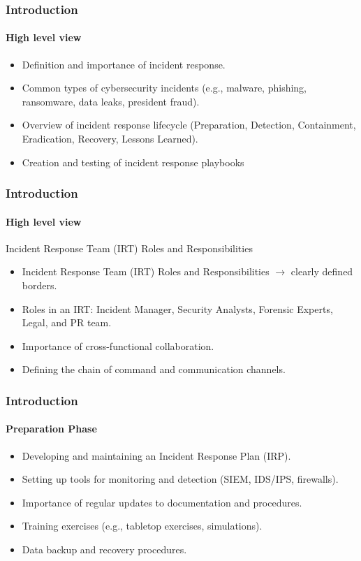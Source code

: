 \begin{frame}
	\frametitle{Introduction}
	\framesubtitle{High level view}
	\begin{itemize}
		\item Definition and importance of incident response.
		\item Common types of cybersecurity incidents (e.g., malware, phishing, ransomware, data leaks, president fraud).
		\item Overview of incident response lifecycle (Preparation, Detection, Containment, Eradication, Recovery, Lessons Learned).
		\item Creation and testing of incident response playbooks
	\end{itemize}
\end{frame}


\begin{frame}
	\frametitle{Introduction}
	\framesubtitle{High level view}
	\begin{block}{Incident Response Team (IRT) Roles and Responsibilities}
		\begin{itemize}
			\item Incident Response Team (IRT) Roles and Responsibilities $\to$ clearly defined borders.
			\item Roles in an IRT: Incident Manager, Security Analysts, Forensic Experts, Legal, and PR team.
    			\item Importance of cross-functional collaboration.
    			\item Defining the chain of command and communication channels.
		\end{itemize}
	\end{block}
\end{frame}

\begin{frame}
	\frametitle{Introduction}
	\framesubtitle{Preparation Phase}
	\begin{itemize}
    		\item Developing and maintaining an Incident Response Plan (IRP).
 		\item Setting up tools for monitoring and detection (SIEM, IDS/IPS, firewalls).
   		\item Importance of regular updates to documentation and procedures.
    		\item Training exercises (e.g., tabletop exercises, simulations).
   		\item Data backup and recovery procedures.
   	\end{itemize}
\end{frame}

